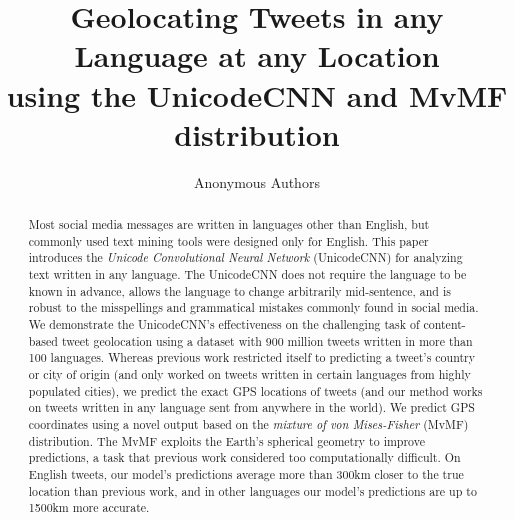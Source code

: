 \documentclass[sigconf,anonymous,review]{acmart}
\title{Geolocating Tweets in any Language at any Location\\using the UnicodeCNN and MvMF distribution}
\author{Anonymous Authors}
\affiliation{}
\newcommand{\defn}[1]{\textit{#1}}
\begin{document}
\begin{abstract}
    Most social media messages are written in languages other than English,
    but commonly used text mining tools were designed only for English.
    This paper introduces the \defn{Unicode Convolutional Neural Network} (UnicodeCNN) for analyzing text written in any language.
    The UnicodeCNN does not require the language to be known in advance,
    allows the language to change arbitrarily mid-sentence,
    and is robust to the misspellings and grammatical mistakes commonly found in social media.
    We demonstrate the UnicodeCNN's effectiveness on the challenging task of content-based tweet geolocation using a dataset with 900 million tweets written in more than 100 languages.
    Whereas previous work restricted itself to predicting a tweet's country or city of origin 
    (and only worked on tweets written in certain languages from highly populated cities),
    we predict the exact GPS locations of tweets 
    (and our method works on tweets written in any language sent from anywhere in the world).
    We predict GPS coordinates using a novel output based on the \defn{mixture of von Mises-Fisher} (MvMF) distribution.
    The MvMF exploits the Earth's spherical geometry to improve predictions,
    a task that previous work considered too computationally difficult.
    On English tweets, our model's predictions average more than 300km closer to the true location than previous work,
    and in other languages our model's predictions are up to 1500km more accurate. 

\end{abstract}
\end{document}
